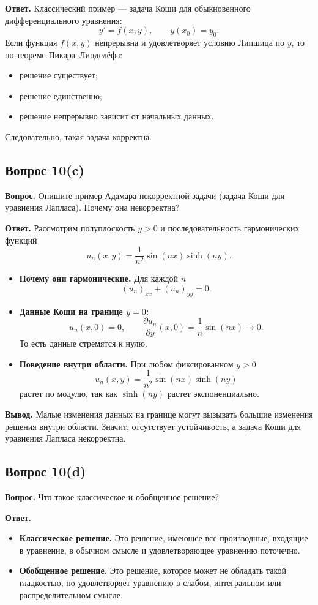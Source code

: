 \documentclass[a4paper,12pt]{article}
\newcommand{\Question}[2]{\subsection*{Вопрос #1}\textbf{Вопрос.} #2}
\newcommand{\Answer}{\textbf{Ответ.}}
\begin{document}
\Answer
Классический пример --- задача Коши для обыкновенного дифференциального уравнения:
\[
y'=f(x,y), \qquad y(x_0)=y_0.
\]
Если функция $f(x,y)$ непрерывна и удовлетворяет условию Липшица по $y$, то по теореме Пикара--Линделёфа:

\begin{itemize}
  \item решение существует;
  \item решение единственно;
  \item решение непрерывно зависит от начальных данных.
\end{itemize}

Следовательно, такая задача корректна.

\Question{10(c)}{Опишите пример Адамара некорректной задачи (задача Коши для уравнения Лапласа). Почему она некорректна?}

\Answer
Рассмотрим полуплоскость $y>0$ и последовательность гармонических функций
\[
u_n(x,y)=\frac{1}{n^2}\sin(nx)\sinh(ny).
\]

\begin{itemize}
  \item \textbf{Почему они гармонические.} Для каждой $n$
  \[
  (u_n)_{xx}+(u_n)_{yy}=0.
  \]

  \item \textbf{Данные Коши на границе $y=0$:}
  \[
  u_n(x,0)=0,
  \qquad
  \frac{\partial u_n}{\partial y}(x,0)=\frac{1}{n}\sin(nx)\to 0.
  \]
  То есть данные стремятся к нулю.

  \item \textbf{Поведение внутри области.} При любом фиксированном $y>0$
  \[
  u_n(x,y)=\frac{1}{n^2}\sin(nx)\sinh(ny)
  \]
  растет по модулю, так как $\sinh(ny)$ растет экспоненциально.
\end{itemize}

\textbf{Вывод.} Малые изменения данных на границе могут вызывать большие изменения решения внутри области. Значит, отсутствует устойчивость, а задача Коши для уравнения Лапласа некорректна.

\Question{10(d)}{Что такое классическое и обобщенное решение?}

\Answer
\begin{itemize}
  \item \textbf{Классическое решение.} Это решение, имеющее все производные, входящие в уравнение, в обычном смысле и удовлетворяющее уравнению поточечно.

  \item \textbf{Обобщенное решение.} Это решение, которое может не обладать такой гладкостью, но удовлетворяет уравнению в слабом, интегральном или распределительном смысле.
\end{itemize}
\end{document}
